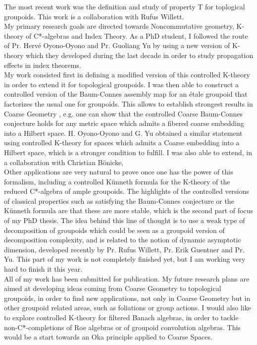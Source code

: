 \documentclass[a4paper]{article}
\begin{document}
The most recent work was the definition and study of property T for toplogical groupoids. This work is a collaboration with Rufus Willett. \\

\newpage
My primary research goals are directed towards Noncommutative geometry, K-theory of C*-algebras and Index Theory. As a PhD student, I followed the route of Pr. Hervé Oyono-Oyono and Pr. Guoliang Yu by using a new version of K-theory which they developed during the last decade in order to study propagation effects in index theorems.\\

My work consisted first in defining a modified version of this controlled K-theory in order to extend it for topological groupoids. I was then able to construct a controlled version of the Baum-Connes assembly map for an étale groupoid that factorizes the usual one for groupoids. This allows to establish strongest results in Coarse Geometry , e.g. one can show that the controlled Coarse Baum-Connes conjecture holds for any metric space which admits a fibered coarse embedding into a Hilbert space. H. Oyono-Oyono and G. Yu obtained a similar statement using controlled K-theory for spaces which admits a Coarse embedding into a Hilbert space, which is a stronger condition to fulfill. I was also able to extend, in a collaboration with Christian B\"onicke, \\

Other applications are very natural to prove once one has the power of this formalism, including a controlled Künneth formula for the K-theory of the reduced C*-algebra of ample groupoids. The highlights of the controlled versions of classical properties such as satisfying the Baum-Connes conjecture or the Künneth formula are that these are more stable, which is the second part of focus of my PhD thesis. The idea behind this line of thought is to use a weak type of decomposition of groupoids which could be seen as a groupoid version of decomposition complexity, and is related to the notion of dynamic asymptotic dimension, developed recently by Pr. Rufus Willett, Pr. Erik Guentner and Pr. Yu. This part of my work is not completely finished yet, but I am working very hard to finish it this year.\\

All of my work has been submitted for publication. My future research plans are aimed at developing ideas coming from Coarse Geometry to topological groupoids, in order to find new applications, not only in Coarse Geometry but in other groupoid related areas, such as foliations or group actions. I would also like to explore controlled K-theory for filtered Banach algebras, in order to tackle non-C*-completions of Roe algebras or of groupoid convolution algebras. This would be a start towards an Oka principle applied to Coarse Spaces. \\
\end{document}
